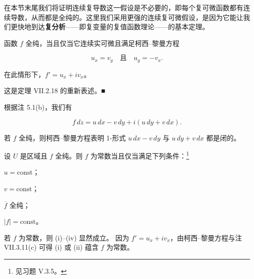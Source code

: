 \begin{remark}

\begin{items}
\item

在本节末尾我们将证明连续复导数这一假设是不必要的，即每个复可微函数都有连续导数，从而都是全纯的。这里我们采用更强的连续复可微假设，是因为它能让我们更快地到达\textbf{复分析}——即复变量的复值函数理论——的基本定理。

\item

函数 $ f $ 全纯，当且仅当它连续实可微且满足柯西–黎曼方程

\[
u_{x} = v_{y} \quad \text{且} \quad u_{y} = -v_{x} .
\]

在此情形下，$ f' = u_{x} + iv_{x} $。

\proofhead
这是定理 VII.2.18 的重新表述。\nobreak\hspace{0.35em}■
\item

根据注 5.1(b)，我们有

\[
f\,dz = u\,dx - v\,dy + i(u\,dy + v\,dx) .
\]

若 $ f $ 全纯，则柯西–黎曼方程表明 1-形式 $ u\,dx - v\,dy $ 与 $ u\,dy + v\,dx $ 都是闭的。

\item

设 $ U $ 是区域且 $ f $ 全纯。则 $ f $ 为常数当且仅当满足下列条件：\footnote{见习题 V.3.5。}

\end{items}

\begin{subitems}
\item

$ u = \mathrm{const} $；

\item

$ v = \mathrm{const} $；

\item

$ \overline{f} $ 全纯；

\item

$ |f| = \mathrm{const} $。

\proofhead
若 $ f $ 为常数，则 (i)–(iv) 显然成立。
因为 $ f' = u_{x} + iv_{x} $，由柯西–黎曼方程与注 VII.3.11(c) 可得 (i) 或 (ii) 蕴含 $ f $ 为常数。
\end{subitems}

\begin{subitems}
\item[（iii）]


\end{subitems}
\end{remark}
